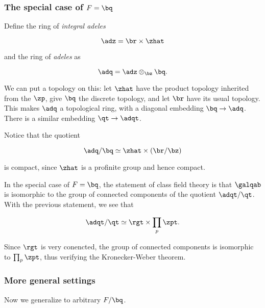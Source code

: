 \subsubsection{The special case of $F=\bq$}

Define the ring of \textit{integral adeles}

\[ \adz = \br \times \zhat \]

and the ring of \textit{adeles} as

\[ \adq = \adz \otimes_\bz \bq. \]

We can put a topology on this: let $\zhat$ have the product topology inherited
from the $\zp$, give $\bq$ the discrete topology, and let $\br$ have its usual
topology. This makes $\adq$ a topological ring, with a diagonal embedding
$\bq\to\adq$. There is a similar embedding $\qt \to \adqt$.

Notice that the quotient

\[ \adq/\bq \simeq \zhat \times (\br/\bz) \]

is compact, since $\zhat$ is a profinite group and hence compact.

In the special case of $F=\bq$, the statement of class field theory is that
$\galqab$ is isomorphic to the group of connected components of the quotient
$\adqt/\qt$. With the previous statement, we see that

\[ \adqt/\qt \simeq \rgt \times \prod_p \zpt. \]

Since $\rgt$ is very conencted, the group of connected components is isomorphic
to $\prod_p \zpt$, thus verifying the Kronecker-Weber theorem.

\subsubsection{More general settings}

Now we generalize to arbitrary $F/\bq$.


